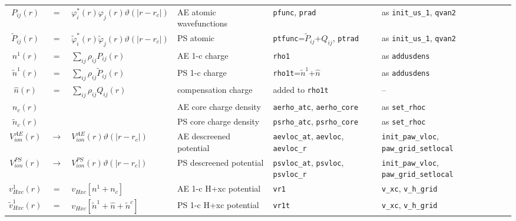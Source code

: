 \documentclass[a4paper,twocolumn,12pt]{article}
\newcommand{\var}[1]{{\tt #1}}
\renewcommand{\phi}{\varphi}
\renewcommand{\theta}{\vartheta}
\begin{document}
\begin{table*}
\begin{small}
\begin{tabular}{|c@{}c@{}l|p{4.5cm}|p{4.5cm}|p{4.0cm}|}
%
$P_{ij}(r)$ &$=$& $\phi^*_i(r)\phi_j(r)\theta(|r-r_c|)$ & AE atomic wavefunctions & \var{pfunc}, \var{prad} & as \var{init\_us\_1}, \var{qvan2}\\
%
$\tilde{P}_{ij}(r)$ &$=$& $\tilde{\phi}^*_i(r)\tilde{\phi}_j(r)\theta(|r-r_c|)$ & PS atomic & \var{ptfunc}=$\tilde{P}_{ij}$+$Q_{ij}$, \var{ptrad} & as \var{init\_us\_1}, \var{qvan2}\\
%
%
\hline ${n}^1(r)$ &$=$& $\sum_{ij}\rho_{ij}{P}_{ij}(r)$ & AE 1-c charge & \var{rho1} & as \var{addusdens} \\
%
$\tilde{n}^1(r)$ &$=$& $\sum_{ij}\rho_{ij}\tilde{P}_{ij}(r)$ & PS 1-c charge & \var{rho1t}=$\tilde{n}^1$+$\hat{n}$& as \var{addusdens} \\
%
$\hat{n}(r)$ &$=$& $\sum_{ij}\rho_{ij}Q_{ij}(r)$ & compensation charge & added to \var{rho1t}
& -- \\
%
%
\hline $n_c(r)$ && & AE core charge density & \var{aerho\_atc}, \var{aerho\_core} & as \var{set\_rhoc}\\
%
$\tilde{n}_c(r)$ && & PS core charge density & \var{psrho\_atc}, \var{psrho\_core} & as \var{set\_rhoc}\\
%
%
\hline $V^{AE}_{ion}(r)$ 
&$\rightarrow$&$V^{AE}_{ion}(r)\theta(|r-r_c|)$ 
& AE descreened potential &  \var{aevloc\_at}, \var{aevloc}, \var{aevloc\_r}& \var{init\_paw\_vloc}, \var{paw\_grid\_setlocal} \\
%
$V^{PS}_{ion}(r)$  
&$\rightarrow$&$V^{PS}_{ion}(r)\theta(|r-r_c|)$
& PS descreened potential &\var{psvloc\_at}, \var{psvloc}, \var{psvloc\_r}& \var{init\_paw\_vloc}, \var{paw\_grid\_setlocal} \\
%
%
\hline ${v}_{Hxc}^1(r)$ &$=$& $v_{Hxc}[{n}^1+{n}_c]$ & AE 1-c H+xc
potential & \var{vr1} & \var{v\_xc}, \var{v\_h\_grid} \\
%
$\tilde{v}_{Hxc}^1(r)$ &$=$& $v_{Hxc}[\tilde{n}^1+\hat{n}+\tilde{n}^c]$ & PS 1-c H+xc potential & \var{vr1t} & \var{v\_xc}, \var{v\_h\_grid} \\

\end{tabular}
\end{small}
\end{table*}
\end{document}
